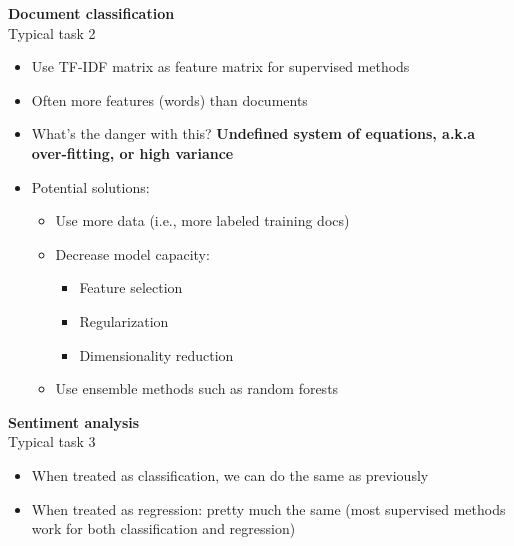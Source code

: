 \documentclass[11pt]{article}
\begin{document}
\begin{center}
  {\LARGE \textbf{Document classification}} \\
  Typical task 2
\end{center}
\vspace{0.5cm}

\begin{itemize}
	\item Use TF-IDF matrix as feature matrix for supervised methods
	\item Often more features (words) than documents
	\item What's the danger with this? \textbf{Undefined system of equations, a.k.a over-fitting, or high variance}
	\item Potential solutions:
		\begin{itemize}
			\item Use more data (i.e., more labeled training docs)
			\item Decrease model capacity:
				\begin{itemize}
					\item Feature selection
					\item Regularization 
					\item Dimensionality reduction
				\end{itemize}
			\item Use ensemble methods such as random forests
		\end{itemize}
\end{itemize}

\vspace{0.5cm}

\begin{center}
  {\LARGE \textbf{Sentiment analysis}} \\
  Typical task 3
\end{center}
\vspace{0.5cm}
\begin{itemize}
	\item When treated as classification, we can do the same as previously
	\item When treated as regression: pretty much the same (most supervised methods work for both classification and regression)
\end{itemize}

\vspace{0.5cm}
\end{document}
